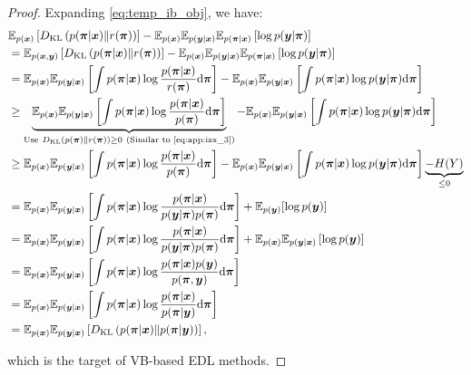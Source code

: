 \begin{proof}
Expanding \cref{eq:temp_ib_obj}, we have:
\begin{equation}
    \begin{aligned}
        &\mathbb{E}_{p(\xv)} \left[\dkl{p(\piv | \xv) \| r(\piv) }\right] - \mathbb{E}_{p(\xv)} \mathbb{E}_{p(\yv| \xv)}\mathbb{E}_{p(\piv | \xv)} \left[ \log p(\yv | \piv) \right] \\
        &= \mathbb{E}_{p(\xv, \yv)} \left[\dkl{p(\piv | \xv) \| r(\piv) }\right] - \mathbb{E}_{p(\xv)} \mathbb{E}_{p(\yv| \xv)}\mathbb{E}_{p(\piv | \xv)}  \left[ \log p(\yv | \piv) \right] \\
        &= \mathbb{E}_{p(\xv)} \mathbb{E}_{p(\yv| \xv)} \left[ \int p(\piv | \xv) \log \frac{p(\piv | \xv)}{r(\piv)} \dd \piv \right] - \mathbb{E}_{p(\xv)} \mathbb{E}_{p(\yv| \xv)} \left[\int p(\piv | \xv) \log p(\yv | \piv) \dd \piv \right] \\
        &\geq \underbrace{\mathbb{E}_{p(\xv)} \mathbb{E}_{p(\yv| \xv)} \left[ \int p(\piv | \xv) \log \frac{p(\piv | \xv)}{p(\piv)} \dd \piv \right]}_{\text{Use} \ \dkl{p(\piv) \| r(\piv)} \geq 0 \ \text{(Similar to \cref{eq:app:izx_3})}} - \mathbb{E}_{p(\xv)} \mathbb{E}_{p(\yv| \xv)} \left[\int p(\piv | \xv) \log p(\yv | \piv) \dd \piv \right] \\
        &\geq \mathbb{E}_{p(\xv)} \mathbb{E}_{p(\yv| \xv)} \left[ \int p(\piv | \xv) \log \frac{p(\piv | \xv)}{p(\piv)} \dd \piv \right] - \mathbb{E}_{p(\xv)} \mathbb{E}_{p(\yv| \xv)} \left[\int p(\piv | \xv) \log p(\yv | \piv) \dd \piv \right] \underbrace{- H(Y)}_{\leq 0} \\
        &= \mathbb{E}_{p(\xv)} \mathbb{E}_{p(\yv| \xv)} \left[ \int p(\piv | \xv) \log \frac{p(\piv | \xv)}{p(\yv | \piv) p(\piv) }\dd \piv\right] + \mathbb{E}_{p(\yv)} [\log p(\yv)] \\
        &= \mathbb{E}_{p(\xv)} \mathbb{E}_{p(\yv| \xv)} \left[ \int p(\piv | \xv) \log \frac{p(\piv | \xv)}{p(\yv | \piv) p(\piv) }\dd \piv\right] + \mathbb{E}_{p(\xv)} \mathbb{E}_{p(\yv| \xv)} \left[\log p(\yv) \right] \\
        &= \mathbb{E}_{p(\xv)} \mathbb{E}_{p(\yv| \xv)} \left[ \int p(\piv | \xv) \log \frac{p(\piv | \xv) p(\yv)}{p(\piv, \yv)} \dd \piv \right] \\
        &= \mathbb{E}_{p(\xv)} \mathbb{E}_{p(\yv| \xv)} \left[ \int p(\piv | \xv) \log \frac{p(\piv | \xv)}{p(\piv | \yv)} \dd \piv \right] \\
        &= \mathbb{E}_{p(\xv)} \mathbb{E}_{p(\yv | \xv)} \left[ \dkl{p(\piv | \xv) \| p(\piv | \yv) }\right],
    \end{aligned}
    \label{eq:app:vb_objective_2}
\end{equation}

which is the target of VB-based EDL methods.
\end{proof}


